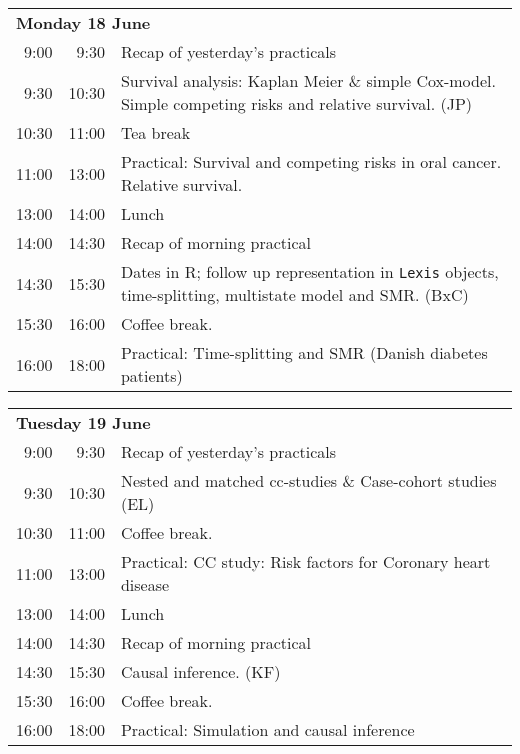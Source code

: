 \noindent
\begin{tabular}{r@{ -- }rp{13cm}}
\multicolumn{3}{l}{\bf Monday 18 June} \\
 9:00 &  9:30 & Recap of yesterday's practicals \\
 9:30 & 10:30 & Survival analysis: Kaplan Meier \& simple
                Cox-model. Simple competing risks and relative
                survival. (JP)\\
10:30 & 11:00 & Tea break\\
11:00 & 13:00 & Practical: Survival and competing risks in oral \newline
                           cancer. Relative survival.\\
13:00 & 14:00 & Lunch \\
14:00 & 14:30 & Recap of morning practical \\
14:30 & 15:30 & Dates in R; follow up representation in \texttt{Lexis} objects,
                time-splitting, multistate model and SMR. (BxC)\\
15:30 & 16:00 & Coffee break. \\
16:00 & 18:00 & Practical: Time-splitting and SMR (Danish diabetes patients)\\[1em]
\end{tabular}

\noindent
\begin{tabular}{r@{ -- }rp{13cm}}
\multicolumn{3}{l}{\bf Tuesday 19 June} \\
 9:00 &  9:30 & Recap of yesterday's practicals \\
 9:30 & 10:30 & Nested and matched cc-studies \& Case-cohort studies (EL) \\
10:30 & 11:00 & Coffee break. \\
11:00 & 13:00 & Practical: CC study: Risk factors for Coronary heart disease\\
13:00 & 14:00 & Lunch \\
14:00 & 14:30 & Recap of morning practical \\
14:30 & 15:30 & Causal inference. (KF)\\
15:30 & 16:00 & Coffee break. \\
16:00 & 18:00 & Practical: Simulation and causal inference\\[1em]
\end{tabular}


